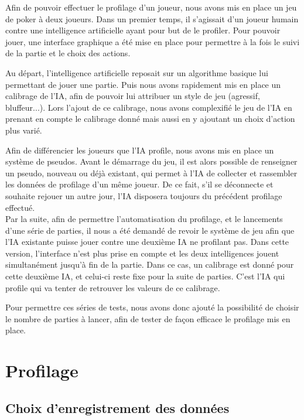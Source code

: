 \documentclass{report}
\begin{document}
\hspace{0.5cm}Afin de pouvoir effectuer le profilage d'un joueur, nous avons mis en place un jeu de poker à deux joueurs. Dans un premier temps, il s'agissait d'un joueur humain contre une intelligence artificielle ayant pour but de le profiler. Pour pouvoir jouer, une interface graphique a été mise en place pour permettre à la fois le suivi de la partie et le choix des actions.\par
Au départ, l'intelligence artificielle reposait sur un algorithme basique lui permettant de jouer une partie. Puis nous avons rapidement mis en place un calibrage de l'IA, afin de pouvoir lui attribuer un style de jeu (agressif, bluffeur...). Lors l'ajout de ce calibrage, nous avons complexifié le jeu de l'IA en prenant en compte le calibrage donné mais aussi en y ajoutant un choix d'action plus varié.\par
Afin de différencier les joueurs que l'IA profile, nous avons mis en place un système de pseudos. Avant le démarrage du jeu, il est alors possible de renseigner un pseudo, nouveau ou déjà existant, qui permet à l'IA de collecter et rassembler les données de profilage d'un même joueur. De ce fait, s'il se déconnecte et souhaite rejouer un autre jour, l'IA disposera toujours du précédent profilage effectué.\\

Par la suite, afin de permettre l'automatisation du profilage, et le lancements d'une série de parties, il nous a été demandé de revoir le système de jeu afin que l'IA existante puisse jouer contre une deuxième IA ne profilant pas. Dans cette version, l'interface n'est plus prise en compte et les deux intelligences jouent simultanément jusqu'à fin de la partie. Dans ce cas, un calibrage est donné pour cette deuxième IA, et celui-ci reste fixe pour la suite de parties. C'est l'IA qui profile qui va tenter de retrouver les valeurs de ce calibrage.\par
Pour permettre ces séries de tests, nous avons donc ajouté la possibilité de choisir le nombre de parties à lancer, afin de tester de façon efficace le profilage mis en place.

\section{Profilage}
\subsection{Choix d'enregistrement des données}
\end{document}
